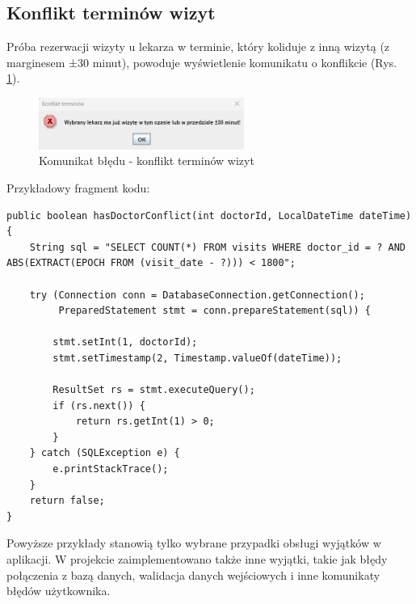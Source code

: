 \subsection{Konflikt terminów wizyt}

Próba rezerwacji wizyty u lekarza w terminie, który koliduje z inną wizytą (z marginesem ±30 minut), powoduje wyświetlenie komunikatu o konflikcie (Rys. \ref{fig:visitConflict}).

\begin{figure}[H]
\centering
\includegraphics[width=0.6\textwidth]{figures/VisitKonflict.png}
\caption{Komunikat błędu - konflikt terminów wizyt}
\label{fig:visitConflict}
\end{figure}

Przykładowy fragment kodu:
\begin{lstlisting}[style=javaStyle, caption={Walidacja konfliktów wizyt ±30 minut u danego lekarza}]
public boolean hasDoctorConflict(int doctorId, LocalDateTime dateTime) {
    String sql = "SELECT COUNT(*) FROM visits WHERE doctor_id = ? AND ABS(EXTRACT(EPOCH FROM (visit_date - ?))) < 1800";

    try (Connection conn = DatabaseConnection.getConnection();
         PreparedStatement stmt = conn.prepareStatement(sql)) {

        stmt.setInt(1, doctorId);
        stmt.setTimestamp(2, Timestamp.valueOf(dateTime));

        ResultSet rs = stmt.executeQuery();
        if (rs.next()) {
            return rs.getInt(1) > 0;
        }
    } catch (SQLException e) {
        e.printStackTrace();
    }
    return false;
}

\end{lstlisting}

Powyższe przykłady stanowią tylko wybrane przypadki obsługi wyjątków w aplikacji. W projekcie zaimplementowano także inne wyjątki, takie jak błędy połączenia z bazą danych, walidacja danych wejściowych i inne komunikaty błędów użytkownika.


